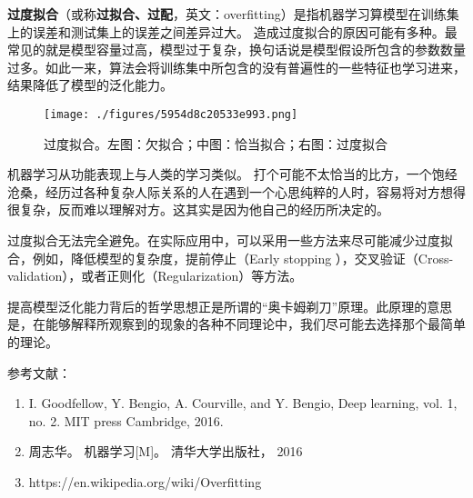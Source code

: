 
\textbf{过度拟合}（或称\textbf{过拟合、过配}，英文：overfitting）是指机器学习算模型在训练集上的误差和测试集上的误差之间差异过大。
造成过度拟合的原因可能有多种。最常见的就是模型容量过高，模型过于复杂，换句话说是模型假设所包含的参数数量过多。如此一来，算法会将训练集中所包含的没有普遍性的一些特征也学习进来，结果降低了模型的泛化能力。

\begin{figure}[ht]
\centering
\texttt{[image: ./figures/5954d8c20533e993.png]}
\caption{过度拟合。左图：欠拟合；中图：恰当拟合；右图：过度拟合} \label{fig_ovfit_1}
\end{figure}

机器学习从功能表现上与人类的学习类似。
打个可能不太恰当的比方，一个饱经沧桑，经历过各种复杂人际关系的人在遇到一个心思纯粹的人时，容易将对方想得很复杂，反而难以理解对方。这其实是因为他自己的经历所决定的。

过度拟合无法完全避免。在实际应用中，可以采用一些方法来尽可能减少过度拟合，例如，降低模型的复杂度，提前停止（Early stopping
），交叉验证（Cross-validation），或者正则化（Regularization）等方法。

提高模型泛化能力背后的哲学思想正是所谓的“奥卡姆剃刀”原理。此原理的意思是，在能够解释所观察到的现象的各种不同理论中，我们尽可能去选择那个最简单的理论。



参考文献：
\begin{enumerate}
\item I. Goodfellow, Y. Bengio, A. Courville, and Y. Bengio, Deep learning, vol. 1, no. 2. MIT press Cambridge, 2016.
\item 周志华。 机器学习[M]。 清华大学出版社， 2016
\item https://en.wikipedia.org/wiki/Overfitting
\end{enumerate}